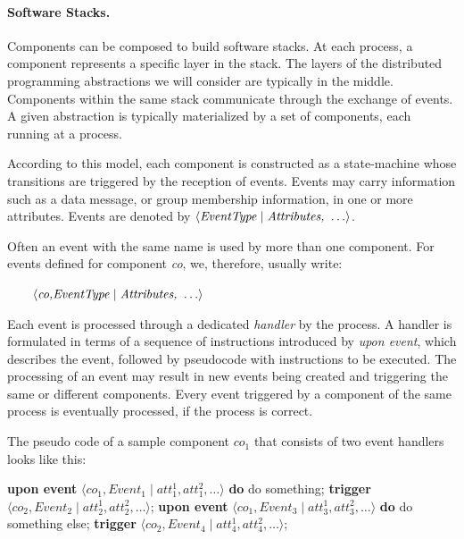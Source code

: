 \documentclass{book}
\begin{document}
\paragraph{Software Stacks.}
Components can be composed to build software stacks.
At each process, a component represents a specific layer in the stack.
The layers of the distributed programming abstractions we will consider are typically in the middle.
Components within the same stack communicate through the exchange of events.
A given abstraction is typically materialized by a set of components, each running at a process.

According to this model, each component is constructed as a state-machine whose transitions are triggered by the reception of events.
Events may carry information such as a data message, or group membership information, in one or more attributes.
Events are denoted by $\langle \text{\textit{EventType}} \mid \text{\textit{Attributes, }} \ldots \rangle$. 

Often an event with the same name is used by more than one component.
For events defined for component \textit{co}, we, therefore, usually write:

$
\qquad \langle \text{\textit{co,EventType}} \mid \text{\textit{Attributes, }} \ldots \rangle
$

Each event is processed through a dedicated \textit{handler} by the process.
A handler is formulated in terms of a sequence of instructions introduced by \textit{upon event}, which describes the event, followed by pseudocode with instructions to be executed.
The processing of an event may result in new events being created and triggering the same or different components.
Every event triggered by a component of the same process is eventually processed, if the process is correct.

The pseudo code of a sample component $co_1$ that consists of two event handlers looks like this:

\begin{center}
    \begin{algorithmic}
    \State \textbf{upon event} $\langle co_1, Event_1 \mid att_{1}^1, att_{1}^2, \ldots \rangle$ \textbf{do}
    \State \quad do something;
    \State \quad \textbf{trigger} $\langle co_2, Event_2 \mid att_{2}^1, att_{2}^2, \ldots \rangle$;
    \Statex
    \State \textbf{upon event} $\langle co_1, Event_3 \mid att_{3}^1, att_{3}^2, \ldots \rangle$ \textbf{do}
    \State \quad do something else;
    \State \quad \textbf{trigger} $\langle co_2, Event_4 \mid att_{4}^1, att_{4}^2, \ldots \rangle$;
    \end{algorithmic}
\end{center}
\end{document}
